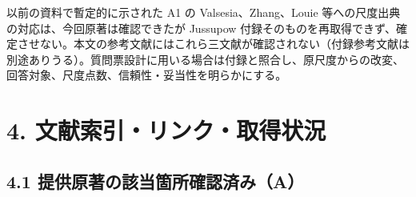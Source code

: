 \documentclass[
  11pt,
  a4paper,
]{article}
\begin{document}
以前の資料で暫定的に示された A1 の Valsesia、Zhang、Louie
等への尺度出典の対応は、今回原著は確認できたが Jussupow
付録そのものを再取得できず、確定させない。本文の参考文献にはこれら三文献が確認されない（付録参考文献は別途ありうる）。質問票設計に用いる場合は付録と照合し、原尺度からの改変、回答対象、尺度点数、信頼性・妥当性を明らかにする。

\section{4.
文献索引・リンク・取得状況}\label{ux6587ux732eux7d22ux5f15ux30eaux30f3ux30afux53d6ux5f97ux72b6ux6cc1}

\subsection{4.1
提供原著の該当箇所確認済み（A）}\label{ux63d0ux4f9bux539fux8457ux306eux8a72ux5f53ux7b87ux6240ux78baux8a8dux6e08ux307fa}
\end{document}
